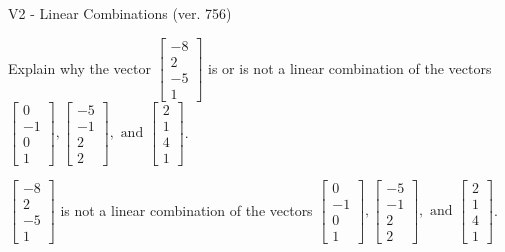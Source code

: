 \begin{exercise}
  \begin{exerciseTitle}V2 - Linear Combinations (ver. 756)\end{exerciseTitle}
  \begin{exerciseStatement}
    Explain why the vector \(\left[\begin{array}{c}
-8 \\
2 \\
-5 \\
1
\end{array}\right]\)  is or is not a linear 
	combination of the vectors \(\left[\begin{array}{c}
0 \\
-1 \\
0 \\
1
\end{array}\right] , \left[\begin{array}{c}
-5 \\
-1 \\
2 \\
2
\end{array}\right] , \text{ and } \left[\begin{array}{c}
2 \\
1 \\
4 \\
1
\end{array}\right]\).
	


  \end{exerciseStatement}
  \begin{exerciseAnswer}
   \(\left[\begin{array}{c}
-8 \\
2 \\
-5 \\
1
\end{array}\right]\) 
  	 is not  
	a linear combination of the vectors \(\left[\begin{array}{c}
0 \\
-1 \\
0 \\
1
\end{array}\right] , \left[\begin{array}{c}
-5 \\
-1 \\
2 \\
2
\end{array}\right] , \text{ and } \left[\begin{array}{c}
2 \\
1 \\
4 \\
1
\end{array}\right]\).

	
  


  \end{exerciseAnswer}
\end{exercise}